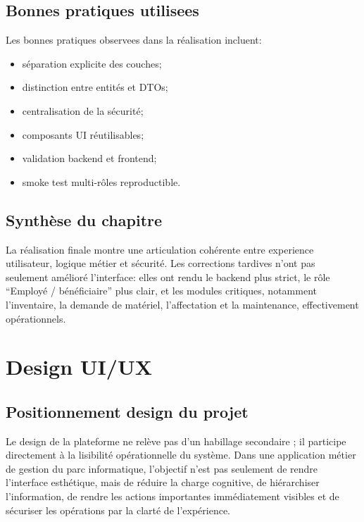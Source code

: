﻿\documentclass[12pt,a4paper,oneside]{report}
\begin{document}
\section{Bonnes pratiques utilisees}
Les bonnes pratiques observees dans la réalisation incluent:
\begin{itemize}
  \item séparation explicite des couches;
  \item distinction entre entités et DTOs;
  \item centralisation de la sécurité;
  \item composants UI réutilisables;
  \item validation backend et frontend;
  \item smoke test multi-rôles reproductible.
\end{itemize}

\section{Synthèse du chapitre}
La réalisation finale montre une articulation cohérente entre experience utilisateur, logique métier et sécurité. Les corrections tardives n'ont pas seulement amélioré l'interface: elles ont rendu le backend plus strict, le rôle \enquote{Employé / bénéficiaire} plus clair, et les modules critiques, notamment l'inventaire, la demande de matériel, l'affectation et la maintenance, effectivement opérationnels.










\chapter{Design UI/UX}
\label{chap:uiux}

\section{Positionnement design du projet}
Le design de la plateforme ne relève pas d'un habillage secondaire ; il participe directement à la lisibilité opérationnelle du système. Dans une application métier de gestion du parc informatique, l'objectif n'est pas seulement de rendre l'interface esthétique, mais de réduire la charge cognitive, de hiérarchiser l'information, de rendre les actions importantes immédiatement visibles et de sécuriser les opérations par la clarté de l'expérience.
\end{document}
